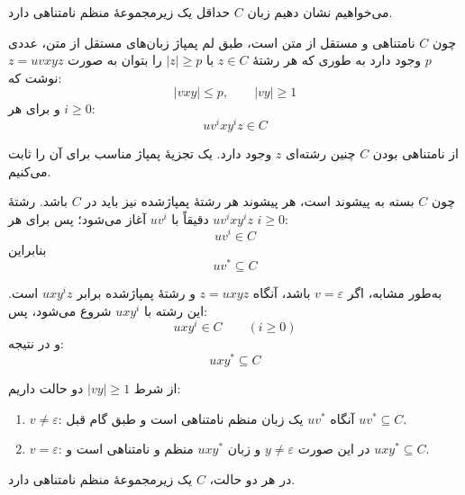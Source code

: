 می‌خواهیم نشان دهیم زبان \(C\) حداقل یک زیرمجموعهٔ منظم نامتناهی دارد.

چون \(C\) نامتناهی و مستقل از متن است، طبق لم پمپاژ زبان‌های مستقل از متن، عددی \(p\) وجود دارد به طوری که هر رشتهٔ \(z\in C\) با \(|z|\ge p\) را بتوان به صورت
\(
z=uvxyz
\)
نوشت که:
\[
|vxy|\le p,\qquad |vy|\ge 1
\]
و برای هر \(i\ge 0\):
\[
uv^ixy^iz \in C
\]

از نامتناهی بودن \(C\) چنین رشته‌ای \(z\) وجود دارد. یک تجزیهٔ پمپاژ مناسب برای آن را ثابت می‌کنیم.

چون \(C\) بسته به پیشوند است، هر پیشوند هر رشتهٔ پمپاژشده نیز باید در \(C\) باشد.
رشتهٔ \(uv^ixy^iz\) دقیقاً با \(uv^i\) آغاز می‌شود؛ پس برای هر \(i\ge 0\):
\[
uv^i \in C
\]
بنابراین
\[
uv^* \subseteq C
\]

به‌طور مشابه، اگر \(v=\varepsilon\) باشد، آنگاه \(z=uxyz\) و رشتهٔ پمپاژشده برابر \(uxy^iz\) است.
این رشته با \(uxy^i\) شروع می‌شود، پس:
\[
uxy^i \in C \qquad (i\ge 0)
\]
و در نتیجه:
\[
uxy^* \subseteq C
\]

از شرط \(|vy|\ge 1\) دو حالت داریم:

\begin{enumerate}
\item \(v\neq\varepsilon\):
آنگاه \(uv^*\) یک زبان منظم نامتناهی است و طبق گام قبل \(uv^*\subseteq C\).

\item \(v=\varepsilon\):
در این صورت \(y\neq\varepsilon\) و زبان \(uxy^*\) منظم و نامتناهی است و \(uxy^*\subseteq C\).
\end{enumerate}

در هر دو حالت، \(C\) یک زیرمجموعهٔ منظم نامتناهی دارد.
